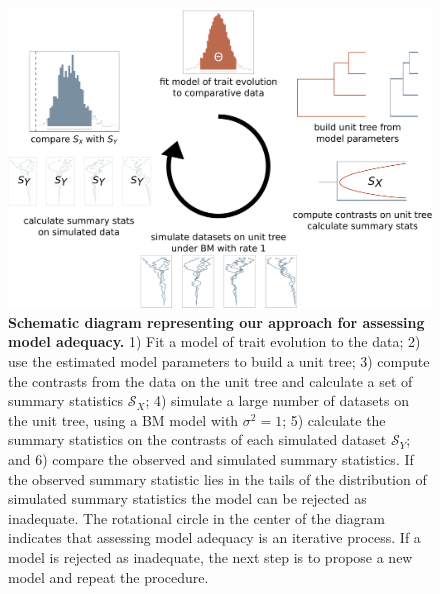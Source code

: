 \documentclass[a4paper,12pt]{article}
\begin{document}
\begin{figure}[p]
  \centering
  \includegraphics[scale=0.28]{figs/flowchart}
  \caption{\textbf{Schematic diagram representing our approach for assessing model adequacy.} 1) Fit a model of trait evolution to the data; 2) use the estimated model parameters to build a unit tree; 3) compute the contrasts from the data on the unit tree and calculate a set of summary statistics $\mathcal{S}_X$; 4) simulate a large number of datasets on the unit tree, using a BM model with $\sigma^2= 1$; 5) calculate the summary statistics on the contrasts of each simulated dataset $\mathcal{S}_Y$; and 6) compare the observed and simulated summary statistics. If the observed summary statistic lies in the tails of the distribution of simulated summary statistics the model can be rejected as inadequate. The rotational circle in the center of the diagram indicates that assessing model adequacy is an iterative process. If a model is rejected as inadequate, the next step is to propose a new model and repeat the procedure.}
  \label{fig:flowchart}
\end{figure}
\end{document}

